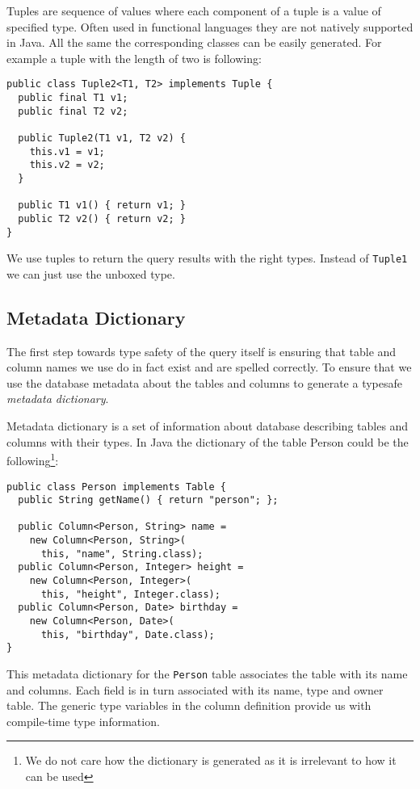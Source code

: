\documentclass{sig-alternate}
\begin{document}
Tuples are sequence of values where each component of a tuple is a value of specified type. Often used in functional languages they are not natively supported in Java. All the same the corresponding classes can be easily generated. For example a tuple with the length of two is following:

\begin{verbatim}
public class Tuple2<T1, T2> implements Tuple {
  public final T1 v1;
  public final T2 v2;

  public Tuple2(T1 v1, T2 v2) {
    this.v1 = v1;
    this.v2 = v2;
  }		

  public T1 v1() { return v1; }
  public T2 v2() { return v2; }
}
\end{verbatim}

We use tuples to return the query results with the right types. Instead of \verb!Tuple1! we can just use the unboxed type.

\subsection{Metadata Dictionary}

The first step towards type safety of the query itself is ensuring that table and column names we use do in fact exist and are spelled correctly. To ensure that we use the database metadata about the tables and columns to generate a typesafe \emph{metadata dictionary}.

Metadata dictionary is a set of information about database describing tables and columns with their types. In Java the dictionary of the table Person could be the following\footnote{We do not care how the dictionary is generated as it is irrelevant to how it can be used}:

\begin{verbatim}
public class Person implements Table {
  public String getName() { return "person"; };

  public Column<Person, String> name = 
    new Column<Person, String>(
      this, "name", String.class);
  public Column<Person, Integer> height = 
    new Column<Person, Integer>(
      this, "height", Integer.class);
  public Column<Person, Date> birthday = 
    new Column<Person, Date>(
      this, "birthday", Date.class);
}
\end{verbatim}

This metadata dictionary for the \verb!Person! table associates the table with its name and columns. Each field is in turn associated with its name, type and owner table. The generic type variables in the column definition provide us with compile-time type information.
\end{document}
